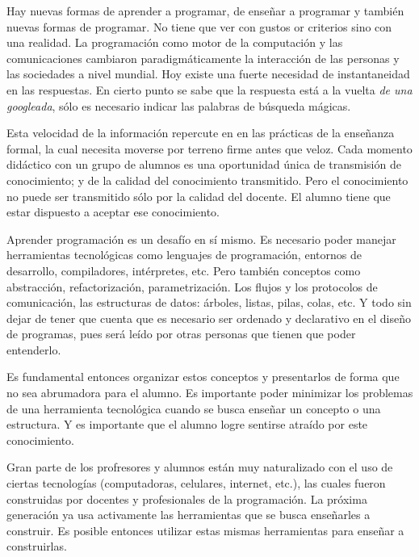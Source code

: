 
Hay nuevas formas de aprender a programar, de enseñar a programar
y también nuevas formas de programar. No tiene que ver con gustos or criterios
sino con una realidad. La programación como motor de la computación y
las comunicaciones cambiaron paradigmáticamente la interacción de las
personas y las sociedades a nivel mundial.
Hoy existe una fuerte necesidad de instantaneidad en las respuestas.
En cierto punto se sabe que la respuesta está a la vuelta
\textit{de una googleada}, sólo es necesario indicar las palabras
de búsqueda mágicas.

Esta velocidad de la información repercute en en las prácticas de
la enseñanza formal, la cual necesita moverse por terreno firme
antes que veloz. Cada momento didáctico con un grupo de alumnos
es una oportunidad única de transmisión de conocimiento; y de la
calidad del conocimiento transmitido.
Pero el conocimiento no puede ser transmitido sólo por la calidad del docente.
El alumno tiene que estar dispuesto a aceptar ese conocimiento.

Aprender programación es un desafío en sí mismo. Es necesario poder
manejar herramientas tecnológicas como lenguajes de programación,
entornos de desarrollo, compiladores, intérpretes, etc. Pero también
conceptos como abstracción, refactorización, parametrización.
Los flujos y los protocolos de comunicación, las
estructuras de datos: árboles, listas, pilas, colas, etc.
Y todo sin dejar de tener que cuenta que es necesario ser ordenado y declarativo
en el diseño de programas, pues será leído por otras personas que
tienen que poder entenderlo.

Es fundamental entonces organizar estos conceptos y presentarlos
de forma que no sea abrumadora para el alumno. Es importante poder
minimizar los problemas de una herramienta tecnológica cuando
se busca enseñar un concepto o una estructura.
Y es importante que el alumno logre sentirse atraído por este conocimiento.

Gran parte de los profresores y alumnos están muy naturalizado con el
uso de ciertas tecnologías (computadoras, celulares, internet, etc.),
las cuales fueron construidas por docentes y profesionales de la programación.
La próxima generación ya usa activamente las herramientas que se busca
enseñarles a construir. Es posible entonces utilizar estas mismas herramientas
para enseñar a construirlas.

